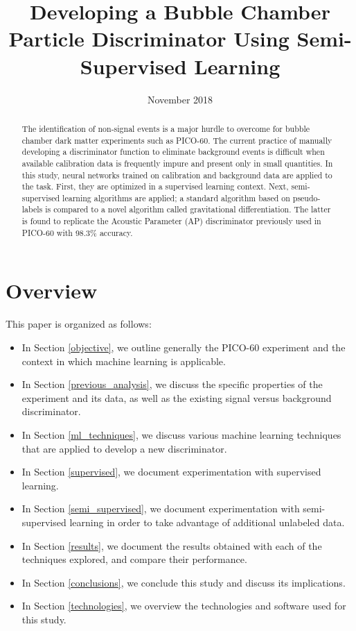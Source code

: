 \documentclass[10pt]{article}
\begin{document}
\title{Developing a Bubble Chamber Particle Discriminator Using Semi-Supervised Learning}

\date{November 2018}
\maketitle

\begin{abstract}
    The identification of non-signal events is a major hurdle to overcome for bubble chamber dark matter experiments such as PICO-60. The current practice of manually developing a discriminator function to eliminate background events is difficult when available calibration data is frequently impure and present only in small quantities. In this study, neural networks trained on calibration and background data are applied to the task. First, they are optimized in a supervised learning context. Next, semi-supervised learning algorithms are applied; a standard algorithm based on pseudo-labels is compared to a novel algorithm called gravitational differentiation. The latter is found to replicate the Acoustic Parameter (AP) discriminator previously used in PICO-60 with 98.3\% accuracy.
\end{abstract}

\pagebreak

\section*{Overview}

This paper is organized as follows:
\begin{itemize}
    \item In Section \ref{objective}, we outline generally the PICO-60 experiment and the context in which machine learning is applicable.
    \item In Section \ref{previous_analysis}, we discuss the specific properties of the experiment and its data, as well as the existing signal versus background discriminator.
    \item In Section \ref{ml_techniques}, we discuss various machine learning techniques that are applied to develop a new discriminator.
    \item In Section \ref{supervised}, we document experimentation with supervised learning.
    \item In Section \ref{semi_supervised}, we document experimentation with semi-supervised learning in order to take advantage of additional unlabeled data.
    \item In Section \ref{results}, we document the results obtained with each of the techniques explored, and compare their performance.
    \item In Section \ref{conclusions}, we conclude this study and discuss its implications.
    \item In Section \ref{technologies}, we overview the technologies and software used for this study.
\end{itemize}
\end{document}
